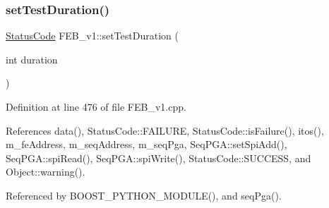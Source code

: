\subsubsection{\texorpdfstring{set\+Test\+Duration()}{setTestDuration()}}
{\footnotesize\ttfamily \hyperlink{classStatusCode}{Status\+Code} F\+E\+B\+\_\+v1\+::set\+Test\+Duration (\begin{DoxyParamCaption}\item[{int}]{duration }\end{DoxyParamCaption})}



Definition at line 476 of file F\+E\+B\+\_\+v1.\+cpp.



References data(), Status\+Code\+::\+F\+A\+I\+L\+U\+RE, Status\+Code\+::is\+Failure(), itos(), m\+\_\+fe\+Address, m\+\_\+seq\+Address, m\+\_\+seq\+Pga, Seq\+P\+G\+A\+::set\+Spi\+Add(), Seq\+P\+G\+A\+::spi\+Read(), Seq\+P\+G\+A\+::spi\+Write(), Status\+Code\+::\+S\+U\+C\+C\+E\+SS, and Object\+::warning().



Referenced by B\+O\+O\+S\+T\+\_\+\+P\+Y\+T\+H\+O\+N\+\_\+\+M\+O\+D\+U\+L\+E(), and seq\+Pga().


